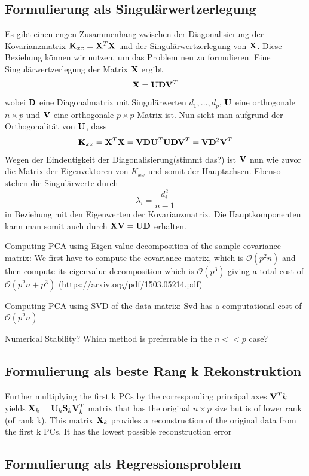 \subsection{Formulierung als Singulärwertzerlegung}
Es gibt einen engen Zusammenhang zwischen der Diagonalisierung der Kovarianzmatrix $\mathbf{K}_{xx} = \mathbf{X}^T \mathbf{X}$ und der Singulärwertzerlegung von $\mathbf{X}$. Diese Beziehung können wir nutzen, um das Problem neu zu formulieren. Eine Singulärwertzerlegung der Matrix $\mathbf{X}$ ergibt
$$ \mathbf{X} = \mathbf{U}\mathbf{D}\mathbf{V}^T $$
wobei $\mathbf{D}$ eine Diagonalmatrix mit Singulärwerten $d_1,\ldots,d_p$, $\mathbf{U}$ eine orthogonale $n \times p$ und $\mathbf{V}$ eine orthogonale $p \times p$ Matrix ist. Nun sieht man aufgrund der Orthogonalität von $\mathbf{U}$, dass
$$\mathbf{K}_{xx} = \mathbf{X}^T \mathbf{X} = \mathbf{V}\mathbf{D}\mathbf{U}^T \mathbf{U}\mathbf{D}\mathbf{V}^T = \mathbf{V} \mathbf{D}^2 \mathbf{V}^T$$
Wegen der Eindeutigkeit der Diagonalisierung(stimmt das?) ist $\mathbf{V}$ nun wie zuvor die Matrix der Eigenvektoren von $K_{xx}$ und somit der Hauptachsen. Ebenso stehen die Singulärwerte durch 
$$\lambda_i = \frac{d_i^2}{n-1}$$
in Beziehung mit den Eigenwerten der Kovarianzmatrix. Die Hauptkomponenten kann man somit auch durch $\mathbf{X} \mathbf{V} = \mathbf{U} \mathbf{D}$ erhalten.

Computing PCA using Eigen value decomposition of the sample covariance matrix:
We first have to compute the covariance matrix, which is $\mathcal{O}(p^2n)$ and then compute its eigenvalue decomposition which is $\mathcal{O}(p^3)$ giving a total cost of $\mathcal{O}(p^2n+p^3)$ (https://arxiv.org/pdf/1503.05214.pdf)

Computing PCA using SVD of the data matrix:
Svd has a computational cost of $\mathcal{O}(p^2n)$

Numerical Stability? Which method is preferrable in the $n << p$ case?


\subsection{Formulierung als beste Rang k Rekonstruktion}
Further multiplying the first k PCs by the corresponding principal axes $\mathbf{V}^T k$ yields $\mathbf{X}_k = \mathbf{U}_k \mathbf{S}_k \mathbf{V}_k^T$ matrix that has the original $n \times p$ size but is of lower rank (of rank k). This matrix $\mathbf{X}_k$ provides a reconstruction of the original data from the first k PCs. It has the lowest possible reconstruction error


\subsection{Formulierung als Regressionsproblem}


